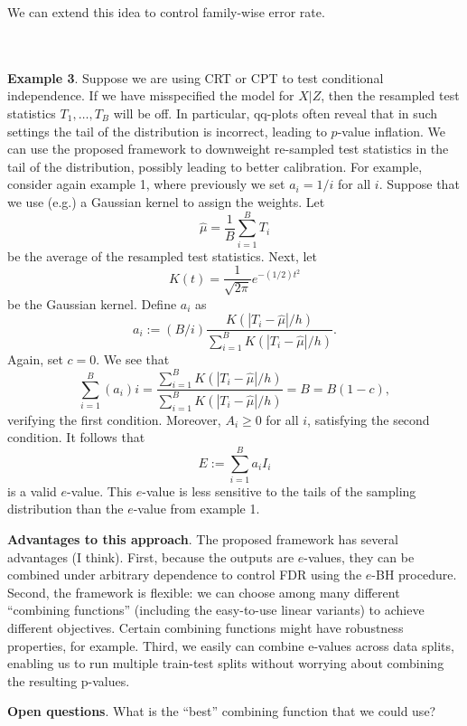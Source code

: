 \documentclass[12pt]{article}
\begin{document}
We can extend this idea to control family-wise error rate. 

\noindent
\\ \\
\textbf{Example 3}. Suppose we are using CRT or CPT to test conditional independence. If we have misspecified the model for $X|Z$, then the resampled test statistics $T_1, \dots, T_B$ will be off. In particular, qq-plots often reveal that in such settings  the tail of the distribution is incorrect, leading to $p$-value inflation. We can use the proposed framework to downweight re-sampled test statistics in the tail of the distribution, possibly leading to better calibration. For example, consider again example 1, where previously we set $a_i = 1/i$ for all $i$. Suppose that we use (e.g.) a Gaussian kernel to assign the weights. Let
$$\hat{\mu} = \frac{1}{B} \sum_{i=1}^B T_i$$ be the average of the resampled test statistics. Next, let $$K(t) = \frac{1}{\sqrt{2 \pi}} e^{-(1/2)t^2}$$ be the Gaussian kernel. Define $a_i$ as
$$a_i :=(B/i)\frac{K(|T_i - \hat{\mu}|/h) }{\sum_{i=1}^B K(|T_i - \hat{\mu}|/h)  }.$$ Again, set $c = 0$. We see that
$$ \sum_{i=1}^B (a_i) i = \frac{ \sum_{i=1}^B K(|T_i - \hat{\mu}|/h) }{ \sum_{i=1}^B K(|T_i - \hat{\mu}|/h)} = B = B(1 - c),$$ verifying the first condition. Moreover, $A_i \geq 0$ for all $i$, satisfying the second condition. It follows that $$E  := \sum_{i=1}^B a_i I_i$$ is a valid $e$-value. This $e$-value is  less sensitive to the tails of the sampling distribution than the $e$-value from example 1.

\textbf{Advantages to this approach}. The proposed framework has several advantages (I think). First, because the outputs are $e$-values, they can be combined under arbitrary dependence to control FDR using the $e$-BH procedure. Second, the framework is flexible: we can choose among many different ``combining functions'' (including the easy-to-use linear variants) to achieve different objectives. Certain combining functions might have robustness properties, for example. Third, we easily can combine e-values across data splits, enabling us to run multiple train-test splits without worrying about combining the resulting p-values.

\textbf{Open questions}. What is the ``best'' combining function that we could use? 
\end{document}
